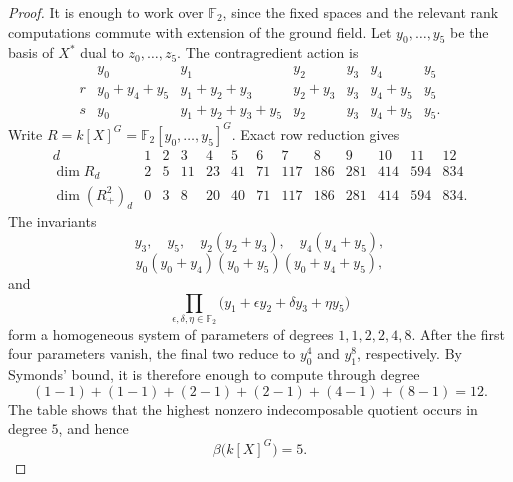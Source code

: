 \documentclass[11pt]{article}
\theoremstyle{definition}
\begin{document}
	\begin{proof}
		It is enough to work over $\mathbb F_2$, since the fixed spaces and the relevant rank computations commute with extension of the ground field. Let $y_0,\ldots,y_5$ be the basis of $X^*$ dual to $z_0,\ldots,z_5$. The contragredient action is
		\[
		\begin{array}{c|cccccc}
			&y_0&y_1&y_2&y_3&y_4&y_5\\ \hline
			r&y_0+y_4+y_5&y_1+y_2+y_3&y_2+y_3&y_3&y_4+y_5&y_5\\[1mm]
			s&y_0&y_1+y_2+y_3+y_5&y_2&y_3&y_4+y_5&y_5.
		\end{array}
		\]
		Write $R=k[X]^G=\mathbb F_2[y_0,\ldots,y_5]^G$. Exact row reduction gives
		\[
		\begin{array}{c|rrrrrrrrrrrr}
			d&1&2&3&4&5&6&7&8&9&10&11&12\\ \hline
			\dim R_d&2&5&11&23&41&71&117&186&281&414&594&834\\
			\dim(R_+^2)_d&0&3&8&20&40&71&117&186&281&414&594&834.
		\end{array}
		\]
		The invariants
		\[
		y_3,\quad y_5,\quad y_2(y_2+y_3),\quad y_4(y_4+y_5),
		\]
		\[
		y_0(y_0+y_4)(y_0+y_5)(y_0+y_4+y_5),
		\]
		and
		\[
		\prod_{\epsilon,\delta,\eta\in\mathbb F_2}
		\bigl(y_1+\epsilon y_2+\delta y_3+\eta y_5\bigr)
		\]
		form a homogeneous system of parameters of degrees $1,1,2,2,4,8$. After the first four parameters vanish, the final two reduce to $y_0^4$ and $y_1^8$, respectively. By Symonds' bound, it is therefore enough to compute through degree
		\[
		(1-1)+(1-1)+(2-1)+(2-1)+(4-1)+(8-1)=12.
		\]
		The table shows that the highest nonzero indecomposable quotient occurs in degree $5$, and hence
		\[
		\beta\bigl(k[X]^G\bigr)=5.
		\]


\end{proof}
\end{document}
